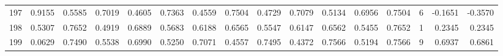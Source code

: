 \begin{tabular}{lrrrrrrrrrrrrrrr}
197 &      0.9155 &  0.5585 &  0.7019 &  0.4605 &  0.7363 &  0.4559 &  0.7504 &  0.4729 &  0.7079 &  0.5134 &   0.6956 &     0.7504 &      6 &                   -0.1651 &                    -0.3570 \\
198 &      0.5307 &  0.7652 &  0.4919 &  0.6889 &  0.5683 &  0.6188 &  0.6565 &  0.5547 &  0.6147 &  0.6562 &   0.5455 &     0.7652 &      1 &                    0.2345 &                     0.2345 \\
199 &      0.0629 &  0.7490 &  0.5538 &  0.6990 &  0.5250 &  0.7071 &  0.4557 &  0.7495 &  0.4372 &  0.7566 &   0.5194 &     0.7566 &      9 &                    0.6937 &                     0.6861 \\
\bottomrule
\end{tabular}
